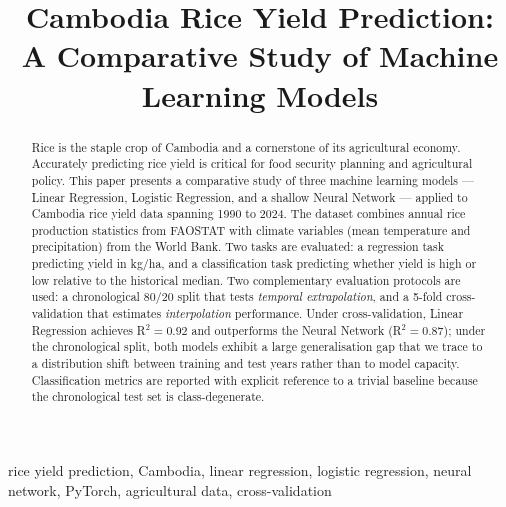 \documentclass[conference]{IEEEtran}
\begin{document}
\title{Cambodia Rice Yield Prediction:\\A Comparative Study of Machine Learning Models}

\author{
}

\maketitle

\begin{abstract}
Rice is the staple crop of Cambodia and a cornerstone of its agricultural economy. Accurately predicting rice yield is critical for food security planning and agricultural policy. This paper presents a comparative study of three machine learning models --- Linear Regression, Logistic Regression, and a shallow Neural Network --- applied to Cambodia rice yield data spanning 1990 to 2024. The dataset combines annual rice production statistics from FAOSTAT with climate variables (mean temperature and precipitation) from the World Bank. Two tasks are evaluated: a regression task predicting yield in kg/ha, and a classification task predicting whether yield is high or low relative to the historical median. Two complementary evaluation protocols are used: a chronological 80/20 split that tests \emph{temporal extrapolation}, and a 5-fold cross-validation that estimates \emph{interpolation} performance. Under cross-validation, Linear Regression achieves R$^2 = 0.92$ and outperforms the Neural Network (R$^2 = 0.87$); under the chronological split, both models exhibit a large generalisation gap that we trace to a distribution shift between training and test years rather than to model capacity. Classification metrics are reported with explicit reference to a trivial baseline because the chronological test set is class-degenerate.
\end{abstract}

\begin{IEEEkeywords}
rice yield prediction, Cambodia, linear regression, logistic regression, neural network, PyTorch, agricultural data, cross-validation
\end{IEEEkeywords}

\end{document}

